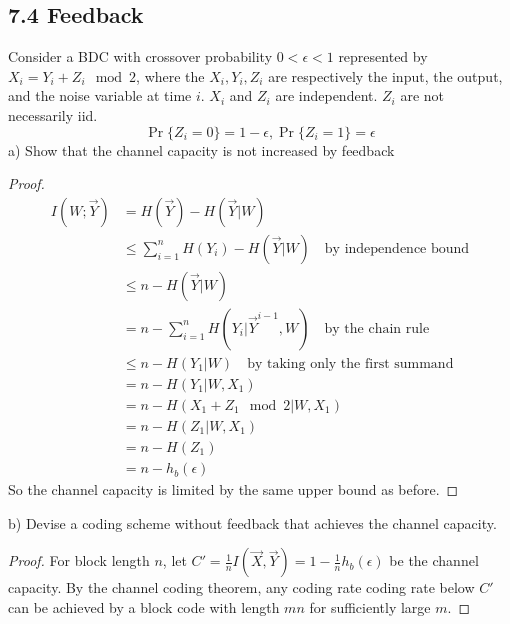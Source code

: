 \documentclass[../main.tex]{subfiles}
\begin{document}
\subsection*{7.4 Feedback} 
Consider a BDC with crossover probability $0<\epsilon<1$ represented by $X_i = Y_i + Z_i\mod 2$, where the $X_i, Y_i, Z_i$ are respectively the input, the output, and the noise variable at time $i$. $X_i$ and $Z_i$ are independent. $Z_i$ are not necessarily iid.\[
\Pr\{Z_i=0\}=1-\epsilon, \Pr\{Z_i=1\}=\epsilon
\]
a) Show that the channel capacity is not increased by feedback
\begin{proof}
  \begin{align*}
      I(W;\vec Y) &= H(\vec Y)-H(\vec Y|W)\\
      &\leq \sum_{i=1}^nH(Y_i)-H(\vec Y|W)\quad \text{by independence bound}\\
      &\leq n-H(\vec Y|W)\\
      &= n - \sum_{i=1}^n H(Y_i|\vec Y^{i-1},W)\quad \text{by the chain rule}\\
      &\leq n - H(Y_1|W) \quad \text{by taking only the first summand}\\
      &= n - H(Y_1|W,X_1) \\
      &= n - H(X_1+Z_1\mod 2|W,X_1)\\
      &=n-H(Z_1|W,X_1)\\
      &= n - H(Z_1)\\
      &= n - h_b(\epsilon)
  \end{align*}
  So the channel capacity is limited by the same upper bound as before.
\end{proof}
b) Devise a coding scheme without feedback that achieves the channel capacity.
\begin{proof}
    For block length $n$, let $C'=\frac{1}{n}I(\vec X, \vec Y)=1-\frac{1}{n}h_b(\epsilon)$ be the channel capacity. By the channel coding theorem, any coding rate coding rate below $C'$ can be achieved by a block code with length $mn$ for sufficiently large $m$.
\end{proof}
\end{document}

